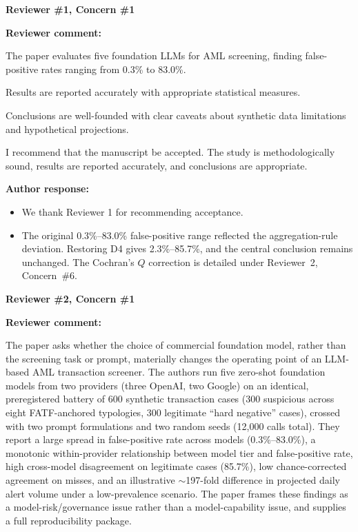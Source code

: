 \documentclass[11pt]{article}
\newcommand{\rvcomment}[1]{{\color{ReviewerGreen}#1}}
\newcommand{\concern}[1]{\textbf{\color{ReviewerGreen}#1}}
\begin{document}
\vspace{12pt}
\concern{Reviewer \#1, Concern \#1}

\concern{Reviewer comment:}

\rvcomment{The paper evaluates five foundation LLMs for AML screening, finding false-positive rates ranging from 0.3\% to 83.0\%.}

\rvcomment{Results are reported accurately with appropriate statistical measures.}

\rvcomment{Conclusions are well-founded with clear caveats about synthetic data limitations and hypothetical projections.}

\rvcomment{I recommend that the manuscript be accepted. The study is methodologically sound, results are reported accurately, and conclusions are appropriate.}

\textbf{Author response:}

\begin{itemize}

\item We thank Reviewer 1 for recommending acceptance.

\item The original 0.3\%--83.0\% false-positive range reflected the aggregation-rule deviation. Restoring D4 gives 2.3\%--85.7\%, and the central conclusion remains unchanged. The Cochran's $Q$ correction is detailed under Reviewer~2, Concern~\#6.

\end{itemize}

\vspace{12pt}
\concern{Reviewer \#2, Concern \#1}

\concern{Reviewer comment:}

\rvcomment{The paper asks whether the choice of commercial foundation model, rather than the screening task or prompt, materially changes the operating point of an LLM-based AML transaction screener. The authors run five zero-shot foundation models from two providers (three OpenAI, two Google) on an identical, preregistered battery of 600 synthetic transaction cases (300 suspicious across eight FATF-anchored typologies, 300 legitimate ``hard negative'' cases), crossed with two prompt formulations and two random seeds (12,000 calls total). They report a large spread in false-positive rate across models (0.3\%--83.0\%), a monotonic within-provider relationship between model tier and false-positive rate, high cross-model disagreement on legitimate cases (85.7\%), low chance-corrected agreement on misses, and an illustrative $\sim$197-fold difference in projected daily alert volume under a low-prevalence scenario. The paper frames these findings as a model-risk/governance issue rather than a model-capability issue, and supplies a full reproducibility package.}
\end{document}
